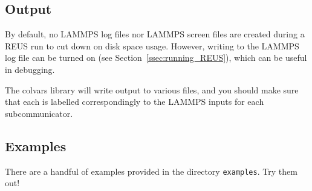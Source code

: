 \documentclass[10pt]{article}
\begin{document}
\subsection{Output}

By default, no LAMMPS log files nor LAMMPS screen files are created during a REUS 
run to cut down on disk space usage. However, writing to the LAMMPS log file can 
be turned on (see Section~\ref{ssec:running_REUS}), which can be useful in debugging.

The colvars library will write output to various files, and you should make sure
that each is labelled correspondingly to the LAMMPS inputs for each subcommunicator.

\subsection{Examples}

There are a handful of examples provided in the directory \texttt{examples}. Try them out!
\end{document}
